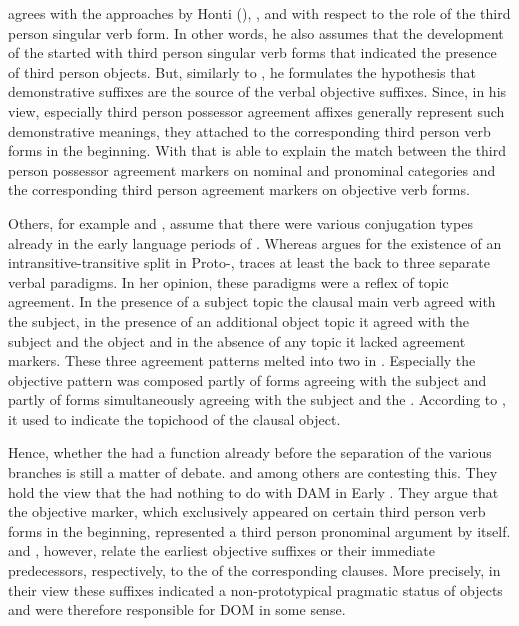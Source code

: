 \documentclass[output=paper]{LSP/langsci}
\begin{document}
\citet[191--196]{Kunnap2008Person} agrees with the approaches by  Honti (\citeyear{Honti1995Morphotaktik,Honti2009Tunodesek}), \citet{Havas2004Objective}, and \citet{Kortvely2005Verb}  with respect to the role of the third person singular verb form. 
In other words, he also assumes that the development of the   started with third person singular verb forms that indicated the presence of third person objects. 
But, similarly to \citet{Redei1962Targyas}, he formulates the hypothesis that demonstrative suffixes are the source of the verbal objective suffixes. Since, in his view, especially third person possessor agreement affixes generally represent such demonstrative meanings, they attached to the corresponding third person verb forms in the beginning. 
With that \citet{Kunnap2008Person} is able to explain the match between the  third person possessor agreement markers on nominal and pronominal categories and the corresponding third person agreement markers on objective verb forms. 

Others, for example \citet{Gulya1995Transitivitat} and \citet{Kiss2010Magyar}, assume that there were various conjugation types already in the early language periods of . 
Whereas \citet[99]{Gulya1995Transitivitat} argues for the existence of an intransitive-transitive split in Proto-, \citet[140–145]{Kiss2010Magyar} traces at least the   back to three separate verbal paradigms. In her opinion, these paradigms were a reflex of topic agreement. In the presence of a subject topic the clausal main verb agreed with the subject, in the presence of an additional object topic it agreed with the subject and the object and in the absence of any topic it lacked agreement markers. These three agreement patterns melted into two in . Especially the objective pattern was composed partly of forms agreeing with the subject and partly of forms simultaneously agreeing with the subject and the . 
According to \citet{Kiss2010Magyar}, it used to indicate the topichood of the clausal object. 

Hence, whether the  had a  function already before the separation of the various  branches is still a matter of debate. \citet{Honti1995Morphotaktik,Honti2009Tunodesek,Havas2004Objective} and \citet{Kortvely2005Verb} among others are contesting this. They hold the view that the  had nothing to do with DAM in Early . They argue that the objective marker, which exclusively appeared on certain third person verb forms in the beginning, represented a third person pronominal argument by itself. \citet{Kunnap2008Person} and \citet{Kiss2010Magyar}, however, relate the earliest objective suffixes or their immediate predecessors, respectively, to the  of the corresponding clauses. More precisely, in their view these suffixes indicated a non-prototypical pragmatic status of objects and were therefore responsible for DOM in some sense. 
\end{document}
